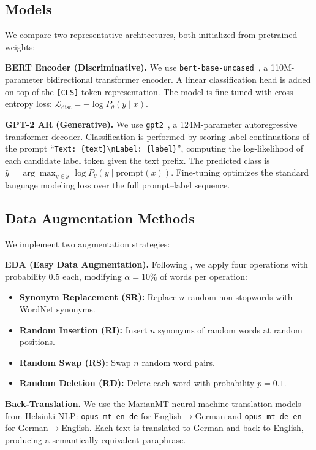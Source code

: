 \documentclass[11pt,a4paper]{article}
\begin{document}
\subsection{Models}

We compare two representative architectures, both initialized from pretrained weights:

\textbf{BERT Encoder (Discriminative).} We use \texttt{bert-base-uncased}~\cite{devlin2019bert}, a 110M-parameter bidirectional transformer encoder. A linear classification head is added on top of the \texttt{[CLS]} token representation. The model is fine-tuned with cross-entropy loss: $\mathcal{L}_{\text{disc}} = -\log P_\theta(y \mid x)$.

\textbf{GPT-2 AR (Generative).} We use \texttt{gpt2}~\cite{radford2019language}, a 124M-parameter autoregressive transformer decoder. Classification is performed by scoring label continuations of the prompt ``\texttt{Text: \{text\}\textbackslash nLabel: \{label\}}'', computing the log-likelihood of each candidate label token given the text prefix. The predicted class is $\hat{y} = \arg\max_{y \in \mathcal{Y}} \log P_\theta(y \mid \text{prompt}(x))$. Fine-tuning optimizes the standard language modeling loss over the full prompt--label sequence.

\subsection{Data Augmentation Methods}

We implement two augmentation strategies:

\textbf{EDA (Easy Data Augmentation).} Following \citet{wei2019eda}, we apply four operations with probability 0.5 each, modifying $\alpha = 10\%$ of words per operation:
\begin{itemize}
    \item \textbf{Synonym Replacement (SR):} Replace $n$ random non-stopwords with WordNet synonyms.
    \item \textbf{Random Insertion (RI):} Insert $n$ synonyms of random words at random positions.
    \item \textbf{Random Swap (RS):} Swap $n$ random word pairs.
    \item \textbf{Random Deletion (RD):} Delete each word with probability $p = 0.1$.
\end{itemize}

\textbf{Back-Translation.} We use the MarianMT neural machine translation models~\cite{junczys2018marian} from Helsinki-NLP: \texttt{opus-mt-en-de} for English$\rightarrow$German and \texttt{opus-mt-de-en} for German$\rightarrow$English. Each text is translated to German and back to English, producing a semantically equivalent paraphrase.
\end{document}
